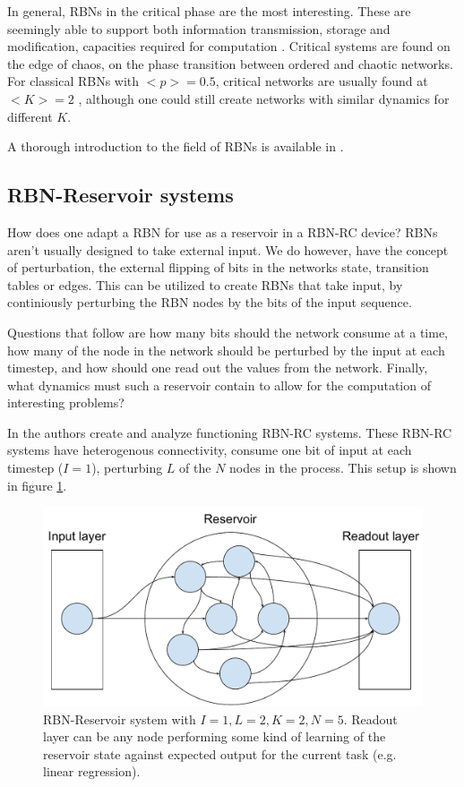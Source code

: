 In general, RBNs in the critical phase are the most interesting.
These are seemingly able to support both information transmission, storage and modification,
capacities required for computation \cite{langton3computation}.
Critical systems are found on the edge of chaos, on the phase transition between ordered and chaotic networks.
For classical RBNs with $<p>=0.5$, critical networks are usually found at $<K>=2$ \cite{gershenson2004introduction},
although one could still create networks with similar dynamics for different $K$.

A thorough introduction to the field of RBNs is available in \cite{gershenson2004introduction}.

\subsection{RBN-Reservoir systems}

How does one adapt a RBN for use as a reservoir in a RBN-RC device?
RBNs aren't usually designed to take external input.
We do however, have the concept of perturbation,
the external flipping of bits in the networks state,
transition tables or edges.
This can be utilized to create RBNs that take input,
by continiously perturbing the RBN nodes by the bits of the input sequence.

Questions that follow are how many bits should the network consume at a time,
how many of the node in the network should be perturbed by the input at each timestep,
and how should one read out the values from the network.
Finally, what dynamics must such a reservoir contain to allow for the computation of interesting problems?

In \cite{rbn-reservoir} the authors create and analyze functioning RBN-RC systems.
These RBN-RC systems have heterogenous connectivity,
consume one bit of input at each timestep ($I=1$),
perturbing $L$ of the $N$ nodes in the process.
This setup is shown in figure \ref{figure:rbn-reservoir}.

\begin{figure}
  \centering
  \includegraphics[width=\columnwidth]{background/RBN-Reservoir.pdf}
  \caption{RBN-Reservoir system with $I=1, L=2, K=2, N=5$.
  Readout layer can be any node performing some kind of learning of the reservoir state against expected output for the current task (e.g. linear regression).}
  \label{figure:rbn-reservoir}
\end{figure}

